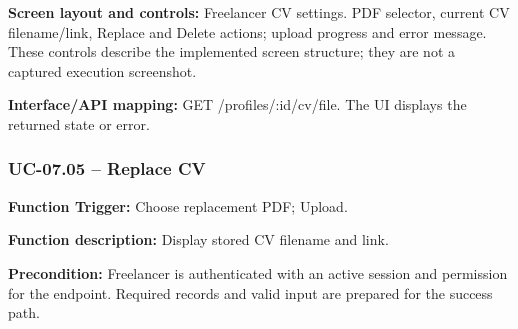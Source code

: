 \textbf{Screen layout and controls:} Freelancer CV settings. PDF selector, current CV filename/\allowbreak{}link, Replace and Delete actions; upload progress and error message. These controls describe the implemented screen structure; they are not a captured execution screenshot.

\textbf{Interface/\allowbreak{}API mapping:} GET /\allowbreak{}profiles/\allowbreak{}:id/\allowbreak{}cv/\allowbreak{}file. The UI displays the returned state or error.

\subsubsection{UC-07.05 -- Replace CV}
\textbf{Function Trigger:} Choose replacement PDF; Upload.

\textbf{Function description:} Display stored CV filename and link.

\textbf{Precondition:} Freelancer is authenticated with an active session and permission for the endpoint. Required records and valid input are prepared for the success path.

